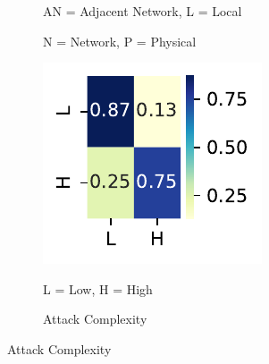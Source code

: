 \documentclass[12pt]{article}
\begin{document}
\begin{figure}
\begin{subfigure}[b]{0.45\textwidth}
		\begin{tablenotes}
			\footnotesize
			\item \quad AN = Adjacent Network, L = Local
			\item \quad N = Network, P = Physical
		\end{tablenotes}
	\end{subfigure}
	\hfill
	\begin{subfigure}[b]{0.45\textwidth}
		\includegraphics[width=\textwidth]{./figures/confusion_matrices/attack_complexity_mitre.pdf}
		\caption{Attack Complexity}
		\begin{tablenotes}
			\footnotesize
			\item \quad L = Low, H = High
		\end{tablenotes}
	\end{subfigure}

	\vspace{1em}


\end{figure}
\end{document}
